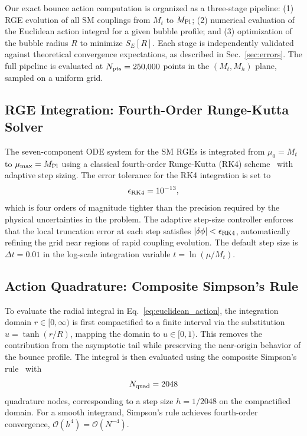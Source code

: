 \documentclass[aps,prd,twocolumn,superscriptaddress,nofootinbib]{revtex4-2}
\begin{document}
Our exact bounce action computation is organized as a three-stage pipeline:
(1) RGE evolution of all SM couplings from $M_t$ to $M_{\rm Pl}$;
(2) numerical evaluation of the Euclidean action integral for a given bubble
profile; and (3) optimization of the bubble radius $R$ to minimize
$S_E[R]$. Each stage is independently validated against theoretical
convergence expectations, as described in Sec.~\ref{sec:errors}.
The full pipeline is evaluated at $N_{\rm pts} = 250{,}000$ points in
the $(M_t, M_h)$ plane, sampled on a uniform grid.

\subsection{RGE Integration: Fourth-Order Runge-Kutta Solver}
\label{subsec:rk4}

The seven-component ODE system for the SM RGEs is integrated from
$\mu_0 = M_t$ to $\mu_{\rm max} = M_{\rm Pl}$ using a classical
fourth-order Runge-Kutta (RK4) scheme~\cite{Press:2007nrbook} with
adaptive step sizing. The error tolerance for the RK4 integration is set to
\begin{equation}
    \epsilon_{\rm RK4} = 10^{-13},
    \label{eq:rk4_tol}
\end{equation}
which is four orders of magnitude tighter than the precision required
by the physical uncertainties in the problem. The adaptive step-size
controller enforces that the local truncation error at each step satisfies
$|\delta \phi| < \epsilon_{\rm RK4}$, automatically refining the grid
near regions of rapid coupling evolution. The default step size is
$\Delta t = 0.01$ in the log-scale integration variable $t = \ln(\mu/M_t)$.

\subsection{Action Quadrature: Composite Simpson's Rule}
\label{subsec:quadrature}

To evaluate the radial integral in Eq.~\eqref{eq:euclidean_action},
the integration domain $r \in [0, \infty)$ is first compactified to a
finite interval via the substitution $u = \tanh(r/R)$, mapping the
domain to $u \in [0, 1)$. This removes the contribution from the
asymptotic tail while preserving the near-origin behavior of the bounce
profile. The integral is then evaluated using the composite Simpson's
rule~\cite{Stoer:2002introduction} with
\begin{equation}
    N_{\rm quad} = 2048
    \label{eq:nquad}
\end{equation}
quadrature nodes, corresponding to a step size $h = 1/2048$ on the
compactified domain. For a smooth integrand, Simpson's rule achieves
fourth-order convergence, $\mathcal{O}(h^4) = \mathcal{O}(N^{-4})$.
\end{document}
